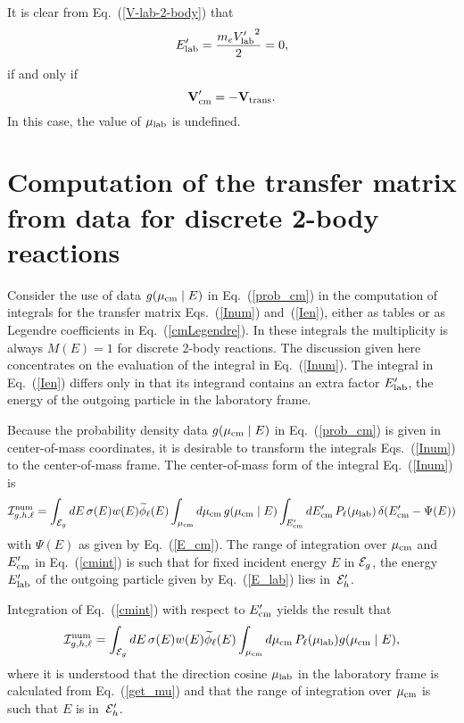 It is clear from Eq.~(\ref{V-lab-2-body}) that 
$$
  E_{\text{lab}}' = \frac{m_e {V_{\text{lab}}'}^2}{2} = 0,
$$
if and only if
$$
  \textbf{V}_{\text{cm}}' = - \textbf{V}_{\text{trans}}.
$$
In this case, the value of $\mu_{\text{lab}}$ is undefined.

\section{Computation of the transfer matrix from data for
discrete 2-body reactions}
Consider the use of data $g(\mu_{\text{cm}} \mid E)$ in Eq.~(\ref{prob_cm})
in the computation of integrals for the transfer matrix
Eqs.~(\ref{Inum}) and~(\ref{Ien}), either as tables or as Legendre
coefficients in Eq.~(\ref{cmLegendre}).  In these integrals
the multiplicity is always $M(E) = 1$ for discrete 2-body reactions.
The discussion given here concentrates on the
evaluation of the integral in Eq.~(\ref{Inum}).  The integral in
Eq.~(\ref{Ien}) differs only in that its integrand contains an extra
factor $E_{\text{lab}}'$, the energy of the outgoing particle in the laboratory frame.

Because the probability density data $g(\mu_{\text{cm}} \mid E)$ in 
Eq.~(\ref{prob_cm}) is given in center-of-mass coordinates, it is
desirable to transform the integrals Eqs.~(\ref{Inum})
to the center-of-mass frame.
The center-of-mass form of the integral Eq.~(\ref{Inum}) is
\begin{equation}
    {\cal I}^{\text{num}}_{g,h,\ell} =
   \int_{{\cal E}_g}dE \, \sigma ( E ) w(E) \widetilde \phi_\ell(E) 
     \int_{\mu_{\text{cm}}} d\mu_{\text{cm}}  \,  g(\mu_{\text{cm}} \mid E)
     \int_{E_{\text{cm}}'} dE_{\text{cm}}' \, P_\ell( \mu_{\text{lab}} ) \,
        \delta(E_{\text{cm}}' - \Psi(E) )
  \label{cmint}
\end{equation}
with $\Psi(E)$ as given by Eq.~(\ref{E_cm}).
The range of integration over $\mu_{\text{cm}}$ and $E_{\text{cm}}'$ in
Eq.~(\ref{cmint})  is such that for fixed incident energy $E$ in ${\cal E}_g$,
the energy $E_{\text{lab}}'$ of the outgoing particle given by Eq.~(\ref{E_lab}) lies
in~${\cal E}_h'$.

Integration of Eq.~(\ref{cmint})  with respect to $E_{\text{cm}}'$ yields the result that
\begin{equation}
    {\cal I}^{\text{num}}_{g,h,\ell} =
     \int_{{\cal E}_g} dE \, \sigma ( E ) w(E) \widetilde \phi_\ell(E) 
    \int_{\mu_{\text{cm}}} d\mu_{\text{cm}}  \,
     P_\ell( \mu_{\text{lab}} ) g(\mu_{\text{cm}} \mid E),
  \label{muEint}
\end{equation}
where it is understood that the direction cosine $\mu_{\text{lab}}$ in the laboratory
frame is calculated from Eq.~(\ref{get_mu}) and that the range of
integration over $\mu_{\text{cm}}$ is such that $E$ is in~${\cal E}_h'$.

